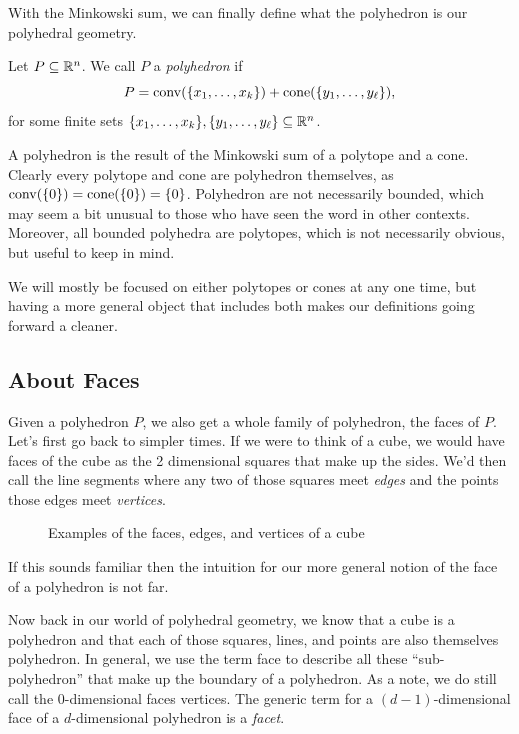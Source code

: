 \documentclass[12pt,oneside]{../../sfsuthesis}
\begin{document}
With the Minkowski sum, we can finally define what the polyhedron is our polyhedral geometry.
\begin{definition}[Polyhedron]\th\label{def:polyhedron}
    Let \( P \subseteq \mathbb{R}^n \). We call \( P \) a \emph{polyhedron} if
    \[
        P = \operatorname{conv}(\{x_1, \dots, x_k\}) + \mathrm{cone}(\{y_1, \dots, y_\ell\}),
    \]
    for some finite sets \( \{x_1, \dots, x_k\}, \{y_1, \dots, y_\ell\} \subseteq \mathbb{R}^n \).
\end{definition}
A polyhedron is the result of the Minkowski sum of a polytope and a cone.
Clearly every polytope and cone are polyhedron themselves, as \( \operatorname{conv}(\{0\}) = \mathrm{cone}(\{0\}) = \{ 0 \} \).
Polyhedron are not necessarily bounded, which may seem a bit unusual to those who have seen the word in other contexts.
Moreover, all bounded polyhedra are polytopes, which is not necessarily obvious, but useful to keep in mind.
\begin{figure}[H]
    \centering
\end{figure}
We will mostly be focused on either polytopes or cones at any one time, but having a more general object that includes both makes our definitions going forward a cleaner.

\subsection{About Faces}
Given a polyhedron \( P \), we also get a whole family of polyhedron, the faces of \( P \).
Let's first go back to simpler times.
If we were to think of a cube, we would have faces of the cube as the 2 dimensional squares that make up the sides.
We'd then call the line segments where any two of those squares meet \textit{edges} and the points those edges meet \textit{vertices}.
\begin{figure}[H]
    \centering
    \caption{Examples of the faces, edges, and vertices of a cube}
\end{figure}
If this sounds familiar then the intuition for our more general notion of the face of a polyhedron is not far.

Now back in our world of polyhedral geometry, we know that a cube is a polyhedron and that each of those squares, lines, and points are also themselves polyhedron.
In general, we use the term face to describe all these ``sub-polyhedron'' that make up the boundary of a polyhedron.
As a note, we do still call the \( 0 \)-dimensional faces vertices.
The generic term for a \( (d - 1) \)-dimensional face of a \( d \)-dimensional polyhedron is a \textit{facet}.
\end{document}
